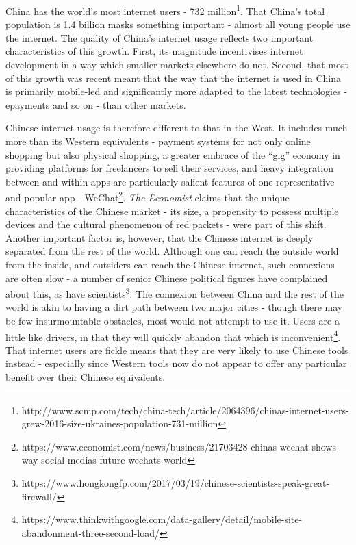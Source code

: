	China has the world's most internet users - 732 million\footnote{http://www.scmp.com/tech/china-tech/article/2064396/chinas-internet-users-grew-2016-size-ukraines-population-731-million}.
	That China's total population is 1.4 billion masks something important -
	almost all young people use the internet. The quality of China's
	internet usage reflects two important characteristics of this growth.
	First, its magnitude incentivises internet development in a way which
	smaller markets elsewhere do not. Second, that most of this growth was
	recent meant that the way that the internet is used in China is
	primarily mobile-led and significantly more adapted to the latest
	technologies - epayments and so on - than other markets.

	Chinese internet usage is therefore different to that in the West. It
	includes much more than its Western equivalents - payment systems for
	not only online shopping but also physical shopping, a greater embrace
	of the ``gig'' economy in providing platforms for freelancers to sell
	their services, and heavy integration between and within apps are
	particularly salient features of one representative and popular app -
	WeChat\footnote{https://www.economist.com/news/business/21703428-chinas-wechat-shows-way-social-medias-future-wechats-world}.
	\textit{The Economist} claims that the unique characteristics of the
	Chinese market - its size, a propensity to possess multiple devices and
	the cultural phenomenon of red packets - were part of this shift.
	Another important factor is, however, that the Chinese internet is
	deeply separated from the rest of the world. Although one can reach the
	outside world from the inside, and outsiders can reach the Chinese
	internet, such connexions are often slow - a number of senior Chinese
	political figures have complained about this, as have
	scientists\footnote{https://www.hongkongfp.com/2017/03/19/chinese-scientists-speak-great-firewall/}.
	The connexion between China and the rest of the world is akin to having
	a dirt path between two major cities - though there may be few
	insurmountable obstacles, most would not attempt to use it. Users are a
	little like drivers, in that they will quickly abandon that which is
	inconvenient\footnote{https://www.thinkwithgoogle.com/data-gallery/detail/mobile-site-abandonment-three-second-load/}.
	That internet users are fickle means that they are very likely to use
	Chinese tools instead - especially since Western tools now do not appear
	to offer any particular benefit over their Chinese equivalents.

